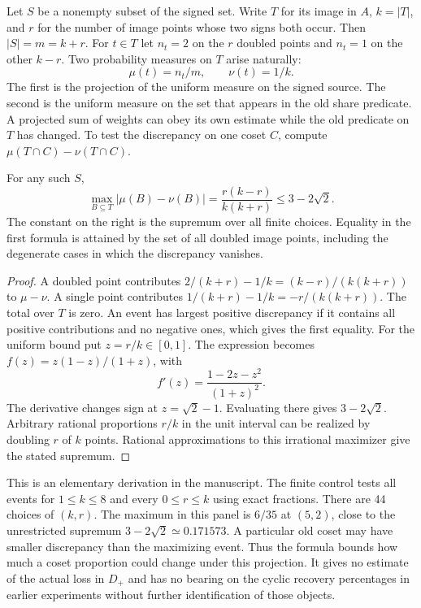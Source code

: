 \documentclass[12pt,letterpaper]{article}
\begin{document}
Let $S$ be a nonempty subset of the signed set. Write $T$ for its image in $A$, $k=|T|$, and $r$ for the number of image points whose two signs both occur. Then $|S|=m=k+r$. For $t\in T$ let $n_t=2$ on the $r$ doubled points and $n_t=1$ on the other $k-r$. Two probability measures on $T$ arise naturally:
\[
             \mu(t)=n_t/m,\qquad \nu(t)=1/k.
\]
The first is the projection of the uniform measure on the signed source. The second is the uniform measure on the set that appears in the old share predicate. A projected sum of weights can obey its own estimate while the old predicate on $T$ has changed. To test the discrepancy on one coset $C$, compute $\mu(T\cap C)-\nu(T\cap C)$.

\begin{proposition}\label{prop:tv}
For any such $S$,
\[
       \max_{B\subseteq T}|\mu(B)-\nu(B)|
             =\frac{r(k-r)}{k(k+r)}
             \le 3-2\sqrt2 .
\]
The constant on the right is the supremum over all finite choices. Equality in the first formula is attained by the set of all doubled image points, including the degenerate cases in which the discrepancy vanishes.
\end{proposition}
\begin{proof}
A doubled point contributes $2/(k+r)-1/k=(k-r)/(k(k+r))$ to $\mu-\nu$. A single point contributes $1/(k+r)-1/k=-r/(k(k+r))$. The total over $T$ is zero. An event has largest positive discrepancy if it contains all positive contributions and no negative ones, which gives the first equality. For the uniform bound put $z=r/k\in[0,1]$. The expression becomes $f(z)=z(1-z)/(1+z)$, with
\[
           f'(z)=\frac{1-2z-z^2}{(1+z)^2}.
\]
The derivative changes sign at $z=\sqrt2-1$. Evaluating there gives $3-2\sqrt2$. Arbitrary rational proportions $r/k$ in the unit interval can be realized by doubling $r$ of $k$ points. Rational approximations to this irrational maximizer give the stated supremum.
\end{proof}

This is an elementary derivation in the manuscript. The finite control tests all events for $1\le k\le8$ and every $0\le r\le k$ using exact fractions. There are 44 choices of $(k,r)$. The maximum in this panel is $6/35$ at $(5,2)$, close to the unrestricted supremum $3-2\sqrt2\simeq0.171573$. A particular old coset may have smaller discrepancy than the maximizing event. Thus the formula bounds how much a coset proportion could change under this projection. It gives no estimate of the actual loss in $D_+$ and has no bearing on the cyclic recovery percentages in earlier experiments without further identification of those objects.
\end{document}
